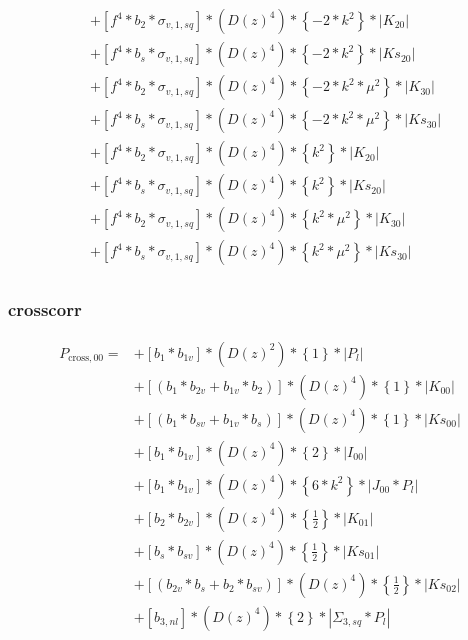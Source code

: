 \documentclass{article}
\begin{document}
\begin{equation}
\begin{aligned}
&+\left[f^{4}*b_{2}*\sigma_{v,1,sq}\right]*\left(D(z)^{4}\right)*\left\{-2*k^{2}\right\}*\left|K_{20}\right| \\
&+\left[f^{4}*b_{s}*\sigma_{v,1,sq}\right]*\left(D(z)^{4}\right)*\left\{-2*k^{2}\right\}*\left|Ks_{20}\right| \\
&+\left[f^{4}*b_{2}*\sigma_{v,1,sq}\right]*\left(D(z)^{4}\right)*\left\{-2*k^{2}*\mu^{2}\right\}*\left|K_{30}\right| \\
&+\left[f^{4}*b_{s}*\sigma_{v,1,sq}\right]*\left(D(z)^{4}\right)*\left\{-2*k^{2}*\mu^{2}\right\}*\left|Ks_{30}\right| \\
&+\left[f^{4}*b_{2}*\sigma_{v,1,sq}\right]*\left(D(z)^{4}\right)*\left\{k^{2}\right\}*\left|K_{20}\right| \\
&+\left[f^{4}*b_{s}*\sigma_{v,1,sq}\right]*\left(D(z)^{4}\right)*\left\{k^{2}\right\}*\left|Ks_{20}\right| \\
&+\left[f^{4}*b_{2}*\sigma_{v,1,sq}\right]*\left(D(z)^{4}\right)*\left\{k^{2}*\mu^{2}\right\}*\left|K_{30}\right| \\
&+\left[f^{4}*b_{s}*\sigma_{v,1,sq}\right]*\left(D(z)^{4}\right)*\left\{k^{2}*\mu^{2}\right\}*\left|Ks_{30}\right| \\
\end{aligned}
\end{equation}





\subsubsection{crosscorr}


\begin{equation}
\begin{aligned} 
P_{\mathrm{cross},00}=
&+\left[b_{1}*b_{1v}\right]*\left(D(z)^{2}\right)*\left\{1\right\}*\left|P_l\right| \\
&+\left[(b_{1}*b_{2v} + b_{1v}*b_{2})\right]*\left(D(z)^{4}\right)*\left\{1\right\}*\left|K_{00}\right| \\
&+\left[(b_{1}*b_{sv} + b_{1v}*b_{s})\right]*\left(D(z)^{4}\right)*\left\{1\right\}*\left|Ks_{00}\right| \\
&+\left[b_{1}*b_{1v}\right]*\left(D(z)^{4}\right)*\left\{2\right\}*\left|I_{00}\right| \\
&+\left[b_{1}*b_{1v}\right]*\left(D(z)^{4}\right)*\left\{6*k^{2}\right\}*\left|J_{00}*P_l\right| \\
&+\left[b_{2}*b_{2v}\right]*\left(D(z)^{4}\right)*\left\{\frac{1}{2}\right\}*\left|K_{01}\right| \\
&+\left[b_{s}*b_{sv}\right]*\left(D(z)^{4}\right)*\left\{\frac{1}{2}\right\}*\left|Ks_{01}\right| \\
&+\left[(b_{2v}*b_{s} + b_{2}*b_{sv})\right]*\left(D(z)^{4}\right)*\left\{\frac{1}{2}\right\}*\left|Ks_{02}\right| \\
&+\left[b_{3,nl}\right]*\left(D(z)^{4}\right)*\left\{2\right\}*\left|\Sigma_{3,sq}*P_l\right| \\
\end{aligned}
\end{equation}
\end{document}
